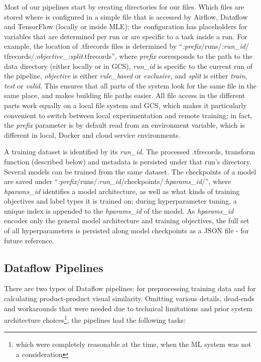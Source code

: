 Most of our pipelines start by creating directories for our files.
Which files are stored where is configured in a simple file that is accessed by Airflow, Dataflow and TensorFlow (locally or inside MLE); the configuration has placeholders for variables that are determined per run or are specific to a task inside a run.
For example, the location of .tfrecords files is determined by ``\textit{:prefix}/runs/\textit{:run\_id}/ tfrecords/\textit{:objective}\_\textit{:split}.tfrecords'', where \textit{prefix} corresponds to the path to the data directory (either locally or in GCS), \textit{run\_id} is specific to the current run of the pipeline, \textit{objective} is either \textit{rule\_based} or \textit{exclusive}, and \textit{split} is either \textit{train}, \textit{test} or \textit{valid}.
This ensures that all parts of the system look for the same file in the same place, and makes building file paths easier.
All file access in the different parts work equally on a local file system and GCS, which makes it particularly convenient to switch between local experimentation and remote training; in fact, the \textit{prefix} parameter is by default read from an environment variable, which is different in local, Docker and cloud service environments.

A training dataset is identified by its \textit{run\_id}.
The processed .tfrecords, transform function (described below) and metadata is persisted under that run's directory.
Several models can be trained from the same dataset.
The checkpoints of a model are saved under ``\textit{:prefix}/runs/\textit{:run\_id}/checkpoints/\textit{:hparams\_id}/'', where \textit{hparams\_id} identifies a model architecture, as well as what kinds of training objectives and label types it is trained on; during hyperparameter tuning, a unique index is appended to the \textit{hparams\_id} of the model.
As \textit{hparams\_id} encodes only the general model architecture and training objectives, the full set of all hyperparameters is persisted along model checkpoints as a JSON file - for future reference.

\subsection{Dataflow Pipelines}
There are two types of Dataflow pipelines: for preprocessing training data and for calculating product-product visual similarity. Omitting various details, dead-ends and workarounds that were needed due to technical limitations and prior system architecture choices\footnote{which were completely reasonable at the time, when the ML system was not a consideration}, the pipelines had the following tasks:

